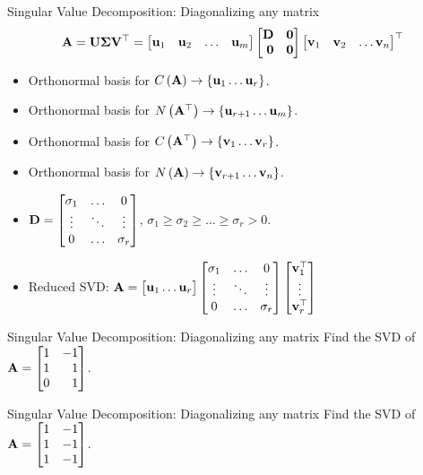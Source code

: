\documentclass[aspectratio=169]{beamer}
\let\olditem\item
\renewcommand{\item}{\setlength{\itemsep}{\fill}\olditem}
\def\mf{\ensuremath\mathbf}
\def\lp{\ensuremath\left(}
\def\rp{\ensuremath\right)}
\def\lc{\ensuremath\left\{}
\def\rc{\ensuremath\right\}}
\def\bmx{\ensuremath\begin{bmatrix*}[r]}
\def\emx{\ensuremath\end{bmatrix*}}
\def\bmxc{\ensuremath\begin{bmatrix*}[c]}
\begin{document}
\begin{frame}[t]{Singular Value Decomposition: Diagonalizing any matrix}
\[ \mf{A} = \mf{U}\mf{\Sigma}\mf{V}^\top = \bmx \mf{u}_1 & \mf{u}_2 & \ldots & \mf{u}_m\emx \bmx \mf{D} & \mf{0}\\ \mf{0} & \mf{0} \emx \bmx \mf{v}_1 & \mf{v}_2 & \ldots \mf{v}_n \emx^\top\]

\begin{itemize}
    \item Orthonormal basis for $C\lp\mf{A}\rp \rightarrow \lc\mf{u}_{1}\ldots\mf{u}_{r}\rc$.
    
    \item Orthonormal basis for $N\lp\mf{A}^\top\rp \rightarrow \lc\mf{u}_{r+1}\ldots\mf{u}_{m}\rc$.
    
    \item Orthonormal basis for $C\lp\mf{A}^\top\rp \rightarrow \lc\mf{v}_{1}\ldots\mf{v}_{r}\rc$.
    \item Orthonormal basis for $N\lp\mf{A}\rp \rightarrow \lc\mf{v}_{r+1}\ldots\mf{v}_{n}\rc$.
    
    \item $\mf{D} = \bmxc \sigma_{1} & \ldots & 0\\\vdots & \ddots & \vdots\\0 & \ldots & \sigma_r\emx$, $\sigma_1 \geq \sigma_2 \geq \ldots \geq \sigma_r > 0$.

    \item Reduced SVD: $\mf{A} = \bmxc\mf{u}_1 \ldots \mf{u}_r\emx \bmxc \sigma_{1} & \ldots & 0\\\vdots & \ddots & \vdots\\0 & \ldots & \sigma_r\emx \bmxc\mf{v}_1^\top\\\vdots\\\mf{v}_r^\top\emx $
\end{itemize}
\end{frame}


\begin{frame}[t]{Singular Value Decomposition: Diagonalizing any matrix}
Find the SVD of $ \mf{A} = \bmx 1 & -1 \\ 1 & 1 \\ 0 & 1 \emx$.
\end{frame}


\begin{frame}[t]{Singular Value Decomposition: Diagonalizing any matrix}
Find the SVD of $ \mf{A} = \bmx 1 & -1 \\ 1 & -1 \\ 1 & -1 \emx$.
\end{frame}
\end{document}
